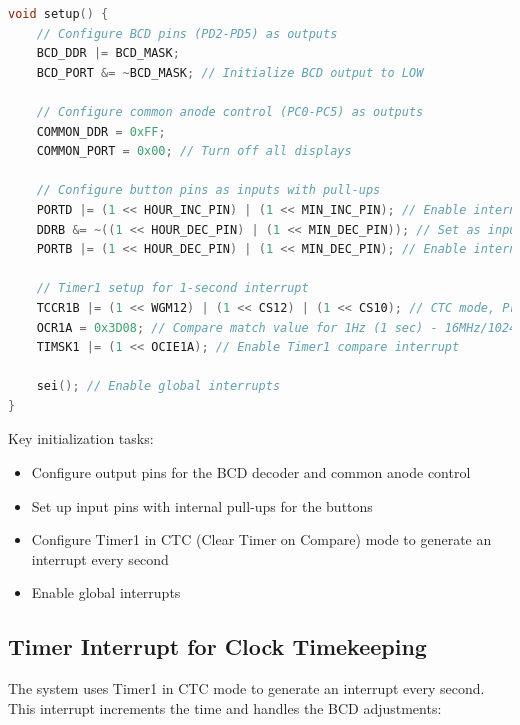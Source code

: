 \documentclass[12pt]{article}
\begin{document}
\begin{lstlisting}[language=C, caption=System Initialization]
void setup() {
    // Configure BCD pins (PD2-PD5) as outputs
    BCD_DDR |= BCD_MASK;
    BCD_PORT &= ~BCD_MASK; // Initialize BCD output to LOW

    // Configure common anode control (PC0-PC5) as outputs
    COMMON_DDR = 0xFF;  
    COMMON_PORT = 0x00; // Turn off all displays

    // Configure button pins as inputs with pull-ups
    PORTD |= (1 << HOUR_INC_PIN) | (1 << MIN_INC_PIN); // Enable internal pull-ups
    DDRB &= ~((1 << HOUR_DEC_PIN) | (1 << MIN_DEC_PIN)); // Set as inputs
    PORTB |= (1 << HOUR_DEC_PIN) | (1 << MIN_DEC_PIN); // Enable internal pull-ups

    // Timer1 setup for 1-second interrupt
    TCCR1B |= (1 << WGM12) | (1 << CS12) | (1 << CS10); // CTC mode, Prescaler = 1024
    OCR1A = 0x3D08; // Compare match value for 1Hz (1 sec) - 16MHz/1024/1Hz - 1
    TIMSK1 |= (1 << OCIE1A); // Enable Timer1 compare interrupt

    sei(); // Enable global interrupts
}
\end{lstlisting}

Key initialization tasks:
\begin{itemize}
    \item Configure output pins for the BCD decoder and common anode control
    \item Set up input pins with internal pull-ups for the buttons
    \item Configure Timer1 in CTC (Clear Timer on Compare) mode to generate an interrupt every second
    \item Enable global interrupts
\end{itemize}

\subsection{Timer Interrupt for Clock Timekeeping}

The system uses Timer1 in CTC mode to generate an interrupt every second. This interrupt increments the time and handles the BCD adjustments:
\end{document}
